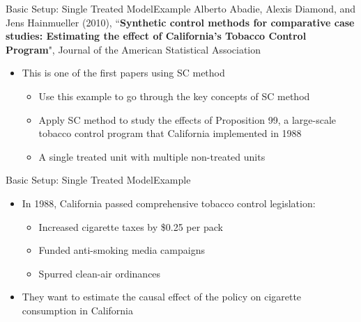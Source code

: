 \documentclass[hyperref={pdfpagelabels=false}]{beamer}
\begin{document}
\begin{frame}{Basic Setup: Single Treated Model}{Example}
Alberto Abadie, Alexis Diamond, and Jens Hainmueller (2010), ``\textbf{Synthetic control methods for comparative case studies: Estimating the effect of California's Tobacco Control Program}", Journal of the American Statistical Association	
\begin{itemize}
\vspace{0.2cm}
\item This is one of the first papers using SC method
\vspace{0.2cm}
\begin{itemize}
\item Use this example to go through the key concepts of SC method	
	\vspace{0.2cm}
\item Apply SC method to study the effects of Proposition 99, a large-scale tobacco control program that California implemented in 1988	
\vspace{0.2cm}	
\item A single treated unit with multiple non-treated units		
\end{itemize}	

\end{itemize}
\end{frame}



\begin{frame}{Basic Setup: Single Treated Model}{Example}
\begin{itemize}
\item In 1988, California passed comprehensive tobacco control legislation:
\begin{itemize}
\vspace{0.2cm}
\item Increased cigarette taxes by \$0.25 per pack
\vspace{0.2cm}
\item Funded anti-smoking media campaigns
\vspace{0.2cm}
\item Spurred clean-air ordinances
\end{itemize}
\vspace{0.2cm}
\item They want to estimate the causal effect of the policy on cigarette consumption in California
\end{itemize}
\end{frame}
\end{document}
